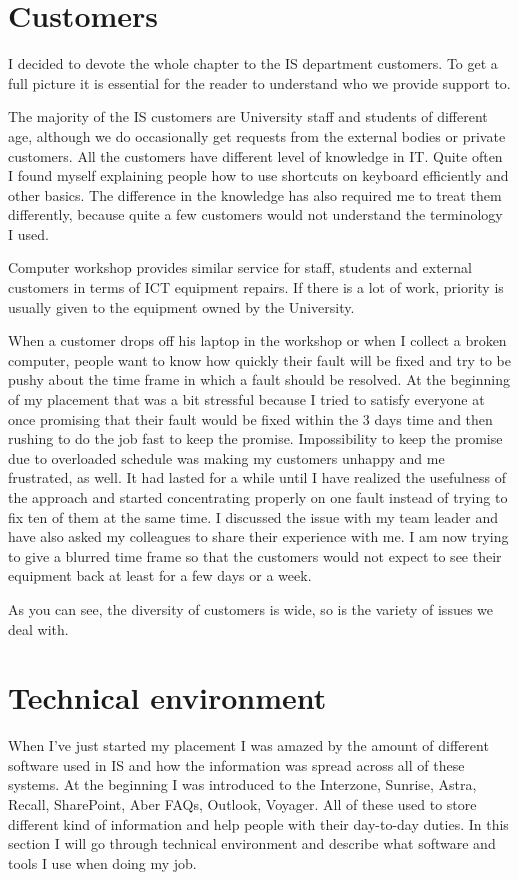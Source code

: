 \documentclass[10pt,a4paper,headinclude=true,twoside]{report}
\begin{document}
\chapter{Customers}
I decided to devote the whole chapter to the IS department customers. To get a full picture it is essential for the reader to understand who we provide support to.

The majority of the IS customers are University staff and students of different age, although we do occasionally get requests from the external bodies or private customers. All the customers have different level of knowledge in IT. Quite often I found myself explaining people how to use shortcuts on keyboard efficiently and other basics. The difference in the knowledge has also required me to treat them differently, because quite a few customers would not understand the terminology I used.  

Computer workshop provides similar service for staff, students and external customers in terms of ICT equipment repairs. If there is a lot of work, priority is usually given to the equipment owned by the University.

When a customer drops off his laptop in the workshop or when I collect a broken computer, people want to know how quickly their fault will be fixed and try to be pushy about the time frame in which a fault should be resolved. At the beginning of my placement that was a bit stressful because I tried to satisfy everyone at once promising that their fault would be fixed within the 3 days time and then rushing to do the job fast to keep the promise. Impossibility to keep the promise due to overloaded schedule was making my customers unhappy and me frustrated, as well. It had lasted for a while until I have realized the usefulness of the approach and started concentrating properly on one fault instead of trying to fix ten of them at the same time. I discussed the issue with my team leader and have also asked my colleagues to share their experience with me. I am now trying to give a blurred time frame so that the customers would not expect to see their equipment back at least for a few days or a week. 

As you can see, the diversity of customers is wide, so is the variety of issues we deal with.

\chapter{Technical environment}
When I've just started my placement I was amazed by the amount of different software used in IS and how the information was spread across all of these systems. At the beginning I was introduced to the Interzone, Sunrise, Astra, Recall, SharePoint, Aber FAQs, Outlook, Voyager. All of these used to store different kind of information and help people with their day-to-day duties. In this section I will go through technical environment and describe what software and tools I use when doing my job.
  
\end{document}
